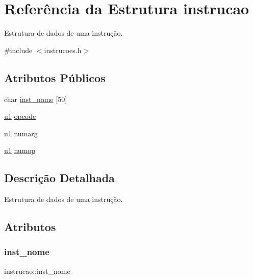 \hypertarget{structinstrucao}{}\section{Referência da Estrutura instrucao}
\label{structinstrucao}


Estrutura de dados de uma instrução.  




{\ttfamily \#include $<$instrucoes.\+h$>$}

\subsection*{Atributos Públicos}
\begin{DoxyCompactItemize}
\item 
char \hyperlink{structinstrucao_ac2c793a7850383fa1cb4cf040d3c3cb4}{inst\+\_\+nome} \mbox{[}50\mbox{]}
\item 
\hyperlink{lista__operandos_8h_ad9f4cdb6757615aae2fad89dab3c5470}{u1} \hyperlink{structinstrucao_a588fa0d2c21e3de3d31382cdd08a3f6c}{opcode}
\item 
\hyperlink{lista__operandos_8h_ad9f4cdb6757615aae2fad89dab3c5470}{u1} \hyperlink{structinstrucao_abe29e9abb3acf6ab4f1b4690d31b456d}{numarg}
\item 
\hyperlink{lista__operandos_8h_ad9f4cdb6757615aae2fad89dab3c5470}{u1} \hyperlink{structinstrucao_ada3363067b90142344358001d51dd197}{numop}
\end{DoxyCompactItemize}


\subsection{Descrição Detalhada}
Estrutura de dados de uma instrução. 

\subsection{Atributos}
\mbox{\label{structinstrucao_ac2c793a7850383fa1cb4cf040d3c3cb4}} 
\subsubsection{\texorpdfstring{inst\+\_\+nome}{inst\_nome}}
{\footnotesize\ttfamily instrucao\+::inst\+\_\+nome}


